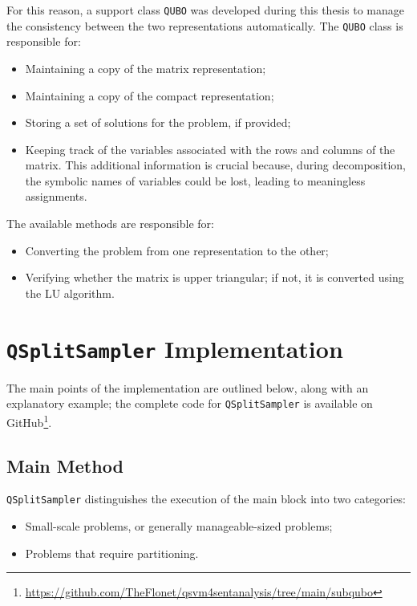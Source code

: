 For this reason, a support class \texttt{QUBO} was developed during this thesis to manage the consistency between the two representations automatically. 
The \texttt{QUBO} class is responsible for: 
\begin{itemize} 
	\item Maintaining a copy of the matrix representation; 
	\item Maintaining a copy of the compact representation; 
	\item Storing a set of solutions for the problem, if provided; 
	\item Keeping track of the variables associated with the rows and col\-umns of the matrix. 
    This additional information is crucial because, during decomposition, the symbolic names of variables could be lost, leading to meaningless assignments.
\end{itemize}

The available methods are responsible for:
\begin{itemize} 
	\item Converting the problem from one representation to the other; 
	\item Verifying whether the matrix is upper triangular; if not, it is converted using the LU algorithm\cite{LU}.
\end{itemize}

\section{\texttt{QSplitSampler} Implementation}\label{sec:qsplitimplementation}

The main points of the implementation are outlined below, along with an explanatory example; the complete code for \texttt{QSplitSampler} is available on GitHub\footnote{\url{https://github.com/TheFlonet/qsvm4sentanalysis/tree/main/subqubo}}.

\subsection{Main Method}

\texttt{QSplitSampler} distinguishes the execution of the main block into two categories: 
\begin{itemize} 
	\item Small-scale problems, or generally manageable-sized problems; 
	\item Problems that require partitioning. 
\end{itemize}


